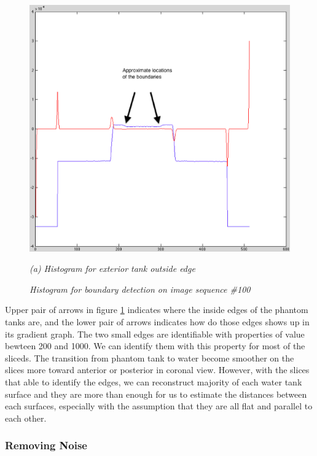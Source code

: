 \begin{figure}[htb]
  \begin{minipage}[t]{5in}
    \centering
    \centerline{\mbox{\includegraphics[width=5in]{data_extraction/images/sample/20121017_100/Coronal/exterior_outside/exterior_outside_histogram_marked.eps}}}
    \centerline{\emph{(a) Histogram for exterior tank outside edge}}
  \end{minipage}
  \caption{\emph{Histogram for boundary detection on image sequence \#100}}
  \label{fig:coronal_270_boundary_histogram}
\end{figure}

Upper pair of arrows in figure \ref{fig:coronal_270_boundary_histogram} indicates where the inside edges of
the phantom tanks are, and the lower pair of arrows indicates how do those edges shows up in its gradient graph.
The two small edges are identifiable with properties of value bewteen 200 and 1000. We can identify them with
this property for most of the sliceds. The transition from phantom tank to water become smoother on the slices
more toward anterior or posterior in coronal view. However, with the slices that able to identify the edges,
we can reconstruct majority of each water tank surface and they are more than enough for us to estimate the
distances between each surfaces, especially with the assumption that they are all flat and parallel to each
other.

\subsubsection{Removing Noise}

